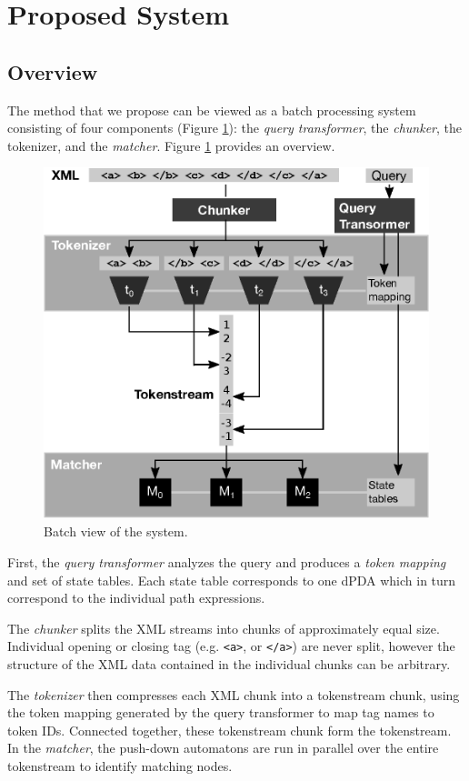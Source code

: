 \section{Proposed System}\label{sec:yourmethod}

\subsection{Overview}

The method that we propose can be viewed as a batch processing system consisting
of four components (Figure \ref{fig:methodoverview}): the \emph{query
transformer}, the \emph{chunker}, the {tokenizer}, and the \emph{matcher}.
Figure \ref{fig:methodoverview} provides an overview.

\begin{figure}[tb]\centering
	\includegraphics[width=.5\textwidth]{img/methodoverview.eps}
  \caption{Batch view of the system.}
  \label{fig:methodoverview}
\end{figure}

First, the \emph{query transformer} analyzes the query and produces a
\emph{token mapping} and set of state tables. Each state table corresponds to
one dPDA which in turn correspond to the individual path expressions.

The \emph{chunker} splits the XML streams into chunks of approximately equal
size. Individual opening or closing tag (e.g. \verb;<a>;, or \verb;</a>;) are
never split, however the structure of the XML data contained in the individual
chunks can be arbitrary.

The \emph{tokenizer} then compresses each XML chunk into a tokenstream chunk,
using the token mapping generated by the query transformer to map tag names to
token IDs. Connected together, these tokenstream chunk form the tokenstream. In
the \emph{matcher}, the push-down automatons are run in parallel over the
entire tokenstream to identify matching nodes.

